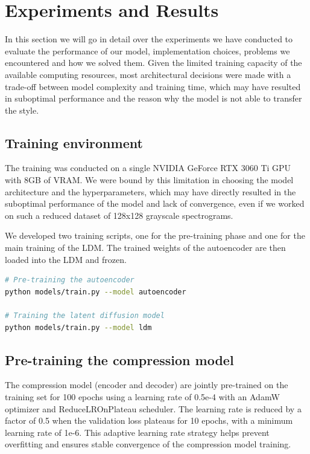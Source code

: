 \section{Experiments and Results}

In this section we will go in detail over the experiments we have conducted to evaluate the performance of our model, implementation choices, problems we encountered and how we solved them. Given the limited training capacity of the available computing resources, most architectural decisions were made with a trade-off between model complexity and training time, which may have resulted in suboptimal performance and the reason why the model is not able to transfer the style.

\subsection{Training environment}

The training was conducted on a single NVIDIA GeForce RTX 3060 Ti GPU with 8GB of VRAM. We were bound by this limitation in choosing the model architecture and the hyperparameters, which may have directly resulted in the suboptimal performance of the model and lack of convergence, even if we worked on such a reduced dataset of 128x128 grayscale spectrograms.

\noindent We developed two training scripts, one for the pre-training phase and one for the main training of the LDM. The trained weights of the autoencoder are then loaded into the LDM and frozen.

\begin{lstlisting}[language=bash, basicstyle=\tiny]
# Pre-training the autoencoder
python models/train.py --model autoencoder

# Training the latent diffusion model
python models/train.py --model ldm
\end{lstlisting}


\subsection{Pre-training the compression model}

The compression model (encoder and decoder) are jointly pre-trained on the training set for 100 epochs using a learning rate of 0.5e-4 with an AdamW optimizer and ReduceLROnPlateau scheduler. The learning rate is reduced by a factor of 0.5 when the validation loss plateaus for 10 epochs, with a minimum learning rate of 1e-6. This adaptive learning rate strategy helps prevent overfitting and ensures stable convergence of the compression model training.

